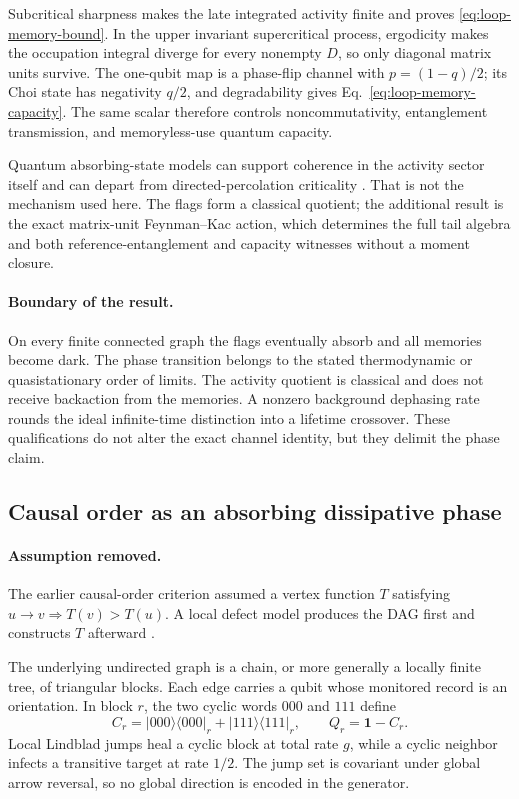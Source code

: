 Subcritical sharpness makes the late integrated activity finite and proves
\eqref{eq:loop-memory-bound}.  In the upper invariant supercritical process,
ergodicity makes the occupation integral diverge for every nonempty \(D\),
so only diagonal matrix units survive.  The one-qubit map is a phase-flip
channel with \(p=(1-q)/2\); its Choi state has negativity \(q/2\), and
degradability gives Eq.~\eqref{eq:loop-memory-capacity}.  The same scalar
therefore controls noncommutativity, entanglement transmission, and
memoryless-use quantum capacity.

Quantum absorbing-state models can support coherence in the activity sector
itself and can depart from directed-percolation criticality
\cite{WamplerCooper2025}.  That is not the mechanism used here.  The flags
form a classical quotient; the additional result is the exact matrix-unit
Feynman--Kac action, which determines the full tail algebra and both
reference-entanglement and capacity witnesses without a moment closure.

\paragraph{Boundary of the result.}
On every finite connected graph the flags eventually absorb and all memories
become dark.  The phase transition belongs to the stated thermodynamic or
quasistationary order of limits.  The activity quotient is classical and
does not receive backaction from the memories.  A nonzero background
dephasing rate rounds the ideal infinite-time distinction into a lifetime
crossover.  These qualifications do not alter the exact channel identity,
but they delimit the phase claim.

\subsection{Causal order as an absorbing dissipative phase}
\label{sec:loop-causal}

\paragraph{Assumption removed.}
The earlier causal-order criterion assumed a vertex function \(T\) satisfying
\(u\to v\Rightarrow T(v)>T(u)\).  A local defect model produces the DAG
first and constructs \(T\) afterward \cite{XuCausalOrder2026}.

The underlying undirected graph is a chain, or more generally a locally
finite tree, of triangular blocks.  Each edge carries a qubit whose monitored
record is an orientation.  In block \(r\), the two cyclic words \(000\) and
\(111\) define
\begin{equation}
 C_r=|000\rangle\langle000|_r+|111\rangle\langle111|_r,
 \qquad Q_r=\mathbf1-C_r .
 \label{eq:loop-cycle-projector}
\end{equation}
Local Lindblad jumps heal a cyclic block at total rate \(g\), while a cyclic
neighbor infects a transitive target at rate \(1/2\).  The jump set is
covariant under global arrow reversal, so no global direction is encoded in
the generator.

